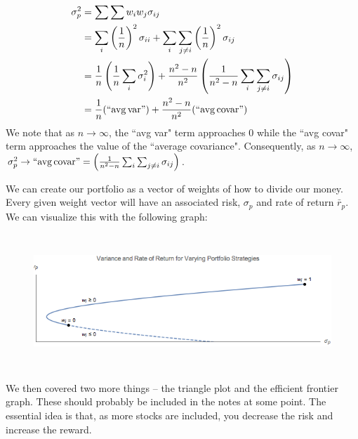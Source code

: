 \documentclass[11pt]{article}
\theoremstyle{definition}
\begin{document}
\begin{align*}
\sigma_p^2 	&= \sum \sum w_i w_j \sigma_{i j}\\
			&= \sum_i \left(\frac 1n\right)^2 \sigma_{i i} + \sum_i \sum_{j \neq i} \left(\frac 1n\right)^2 \sigma_{ij}\\
			&= \frac 1n \left(\frac 1n \sum_i \sigma_i^2\right) + \frac{n^2 - n}{n^2}\left(\frac{1}{n^2 - n} \sum_i \sum_{j\neq i}\sigma_{ij}\right)\\
			&= \frac 1n (\mathrm{``avg \, var"}) + \frac{n^2 - n}{n^2}(\mathrm{``avg \, covar"}) 
\end{align*}
We note that as $n \to \infty$, the ``avg var" term  approaches 0 while the ``avg covar" term approaches the value of the ``average covariance". Consequently, as $n \to \infty$, $\sigma_p^2 \to \mathrm{``avg \, covar"} = \left(\frac{1}{n^2 - n} \sum_i \sum_{j\neq i}\sigma_{ij}\right)$.

We can create our portfolio as a vector of weights of how to divide our money. Every given weight vector will have an associated risk, $\sigma_p$ and rate of return $\bar{r}_p$. We can visualize this with the following graph:
\begin{figure}
\centering
\includegraphics[width=5in, height=2in]{figures/stocks.png}
\end{figure}

We then covered two more things -- the triangle plot and the efficient frontier graph. These should probably be included in the notes at some point. The essential idea is that, as more stocks are included, you decrease the risk and increase the reward. 
\end{document}
